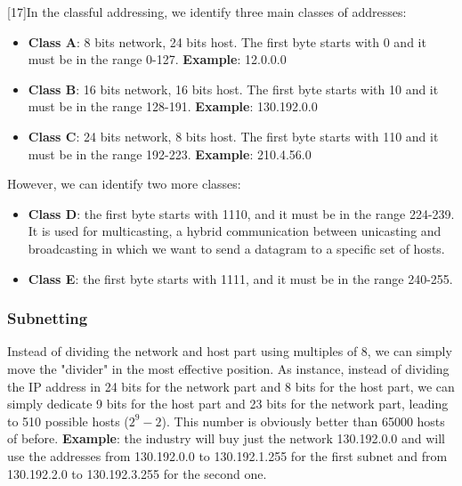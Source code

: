 [17]In the classful addressing, we identify three main classes of addresses:
\begin{itemize}
    \item \textbf{Class A}: 8 bits network, 24 bits host. The first byte starts with 0 and it must be in the range 0-127. \textbf{Example}: 12.0.0.0
    \item \textbf{Class B}: 16 bits network, 16 bits host. The first byte starts with 10 and it must be in the range 128-191. \textbf{Example}: 130.192.0.0
    \item \textbf{Class C}: 24 bits network, 8 bits host. The first byte starts with 110 and it must be in the range 192-223. \textbf{Example}: 210.4.56.0
\end{itemize}
However, we can identify two more classes:
\begin{itemize}
    \item \textbf{Class D}: the first byte starts with 1110, and it must be in the range 224-239. It is used for multicasting, a hybrid communication between unicasting and broadcasting in which we want to send a datagram to a specific set of hosts.
    \item \textbf{Class E}: the first byte starts with 1111, and it must be in the range 240-255.
\end{itemize}

\subsubsection{Subnetting}
Instead of dividing the network and host part using multiples of 8, we can simply move the "divider" in the most effective position. As instance, instead of dividing the IP address in 24 bits for the network part and 8 bits for the host part, we can simply dedicate 9 bits for the host part and 23 bits for the network part, leading to 510 possible hosts (\(2^{9}-2\)). This number is obviously better than 65000 hosts of before. \textbf{Example}: the industry will buy just the network 130.192.0.0 and will use the addresses from 130.192.0.0 to 130.192.1.255 for the first subnet and from 130.192.2.0 to 130.192.3.255 for the second one.

